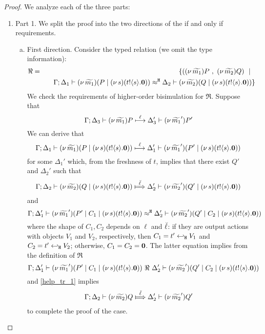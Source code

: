 \begin{proof}
We analyze each of the three parts:
\begin{enumerate}[$-$]
	\item Part 1. We split the proof into the two directions
	of the if and only if requirements.
	\begin{enumerate}[a)]
		\item	First direction. Consider the typed relation (we omit the type information):
				\begin{eqnarray*}
					\Re &=& \set{	(\news{\widetilde{m_1}}P\ , \ 
									\news{\widetilde{m_2}}Q) \setbar\\
					&&
									\quad \horel{\Gamma}{\Delta_1}{\newsp{\widetilde{m_1}}{P \Par \newsp{s}{\bout{t}{s} \inact}  } }
									{\hwb}
									{\Delta_2}{\newsp{\widetilde{m_2}}{Q \Par \newsp{s}{\bout{t}{s} \inact}  } }
					}
				\end{eqnarray*}
				We check the requirements of higher-order bisimulation
				for  $\Re$.
				Suppose that
				\[
					\Gamma; \Delta_3 \vdash (\nu\, \widetilde{m_1})P     \stackrel{\ell}{\longmapsto} \Delta_3' \vdash (\nu\, \widetilde{m_1}')P'
				\]
				We can derive that
				\[
					\Gamma; \Delta_1 \vdash (\nu\, \widetilde{m_1})(P \;|\; (\nu\, s)(t ! \langle s \rangle . \mathbf{0})  )  \stackrel{\ell}{\longmapsto} \Delta_1' \vdash (\nu\, \widetilde{m_1}')(P' \;|\; (\nu\, s)(t ! \langle s \rangle . \mathbf{0})  )
				\]
				for some $\Delta_1'$
				which, from the freshness of $t$, implies that there exist $Q'$ and $\Delta_2'$
				such that
				\begin{eqnarray}
					\horel{\Gamma}{\Delta_2}{\newsp{\widetilde{m_2}}{Q \Par \newsp{s}{\bout{t}{s} \inact}  } }
					{\Hby{\mact{\ell}}}
					{\Delta_2'}{\newsp{\widetilde{m_2}'}{Q' \Par \newsp{s}{\bout{t}{s} \inact}  } }
					\label{help_tr_1}
				\end{eqnarray}
				and
				\[
					\Gamma; \Delta_1' \vdash (\nu\, \widetilde{m_1}')(P' \;|\; C_1 \;|\; (\nu\, s)(t ! \langle s \rangle . \mathbf{0})  )  \approx^\mathtt{H} \Delta_2' \vdash (\nu\, \widetilde{m_2}')(Q' \;|\; C_2 \;|\; (\nu\, s)(t ! \langle s \rangle . \mathbf{0})  )
				\]
				where the shape of $C_1, C_2$ depends on $\ell$ and $\breve{\ell}$:
				if they are output actions
				with objects $V_1$ and $V_2$, respectively, then 
				$C_1 = t' \hookleftarrow_{\mathtt{H}} V_1$ and $C_2 = t' \hookleftarrow_{\mathtt{H}} V_2$; 
				otherwise, $C_1 = C_2 = \mathbf{0}$.
				The latter equation implies from the definition of $\Re$
				\[
					\Gamma; \Delta_1' \vdash (\nu\, \widetilde{m_1}')(P' \;|\; C_1 \;|\; (\nu\, s)(t ! \langle s \rangle . \mathbf{0})  )  \ \Re\  \Delta_2' \vdash (\nu\, \widetilde{m_2}')(Q' \;|\; C_2 \;|\; (\nu\, s)(t ! \langle s \rangle . \mathbf{0})  )
				\]
				and \eqref{help_tr_1} implies
				\begin{eqnarray*}
					\horel{\Gamma}{\Delta_2}{\news{\widetilde{m_2}}Q}
					{\Hby{\mact{\ell}}}
					{\Delta_2'}{\news{\widetilde{m_2}'} Q'}
				\end{eqnarray*}
				to complete the proof of the case.


\end{enumerate}
\end{enumerate}
\end{proof}
